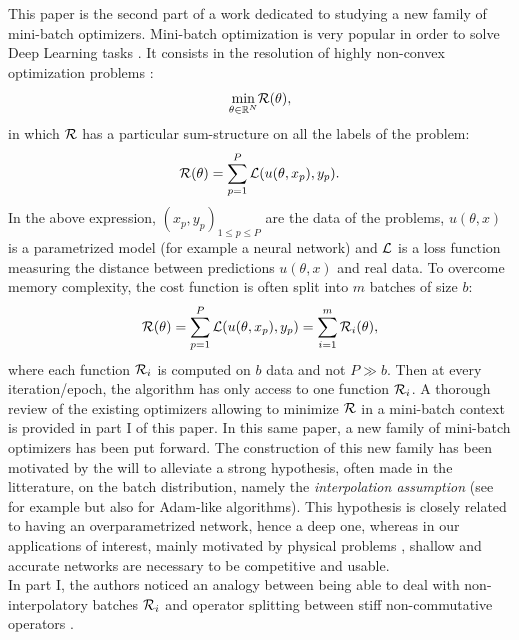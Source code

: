  
This paper is the second part of a work dedicated to studying a new family of mini-batch optimizers. 
Mini-batch optimization is very popular in order to solve Deep Learning tasks \cite{image_recognition,language_recognition,plasma}. 
It consists in the resolution of highly non-convex optimization problems \cite{DL_opti}:
\begin{equation*}
\displaystyle{\min_{\theta \in \mathbb{R}^N}} \mathcal{R}(\theta),
\end{equation*}
in which $\mathcal{R}$ has a particular sum-structure on all the labels of the problem:
\begin{equation*}
	\mathcal{R}(\theta) = \displaystyle{\sum_{p=1}^{P} \mathcal{L}(u(\theta,x_p), y_p)}.
\end{equation*}
In the above expression, $(x_p,y_p)_{1\leq p \leq P}$ are the data of the problems, $u(\theta,x)$ is a parametrized model (for example a neural network) and $\mathcal{L}$ is a loss function measuring the distance between predictions $u(\theta,x)$ and real data. 
To overcome memory complexity, the cost function is often split into $m$ batches of size $b$:
\begin{equation}
	\mathcal{R}(\theta) = \displaystyle{\sum_{p=1}^{P} \mathcal{L}(u(\theta,x_p), y_p)} = \sum_{i=1}^m \mathcal{R}_i(\theta),
	\label{pb_somme_fini}
\end{equation}
where each function $\mathcal{R}_i$ is computed on $b$ data and not $P \gg b$. 
Then at every iteration/epoch, the algorithm has only access to one function $\mathcal{R}_i$.
A thorough review of the existing optimizers allowing to minimize $\mathcal{R}$ in a mini-batch context is provided in part I of this paper. 
In this same paper, a new family of mini-batch optimizers has been put forward. 
The construction of this new family has been motivated by the will to alleviate a strong hypothesis, often made in the litterature, 
on the batch distribution, namely the {\em interpolation assumption} (see \cite{ESG_upper_bound,ESG_IG} for example but also  \cite{sgd_prec,adam1,adam2,zou_rms,rms_not_bounded}
for Adam-like algorithms).
This hypothesis is closely related to having an overparametrized network, hence a deep one, whereas 
in our applications of interest, mainly motivated by physical problems \cite{FV_scheme,reentry,acc_newt,FRANCK,plasma,KluthRipoll}, shallow and accurate networks are necessary to
be competitive and usable.\\
In part I, the authors noticed an analogy between being able to deal with non-interpolatory batches $\mathcal{R}_i$ and operator splitting between stiff non-commutative operators \cite{rebalanced_splitting}. 
